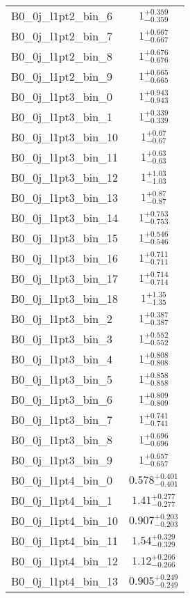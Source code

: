\begin{tabular}{|l|c|}
B0\_0j\_l1pt2\_bin\_6 & $1^{+0.359}_{-0.359}$ \\
B0\_0j\_l1pt2\_bin\_7 & $1^{+0.667}_{-0.667}$ \\
B0\_0j\_l1pt2\_bin\_8 & $1^{+0.676}_{-0.676}$ \\
B0\_0j\_l1pt2\_bin\_9 & $1^{+0.665}_{-0.665}$ \\
B0\_0j\_l1pt3\_bin\_0 & $1^{+0.943}_{-0.943}$ \\
B0\_0j\_l1pt3\_bin\_1 & $1^{+0.339}_{-0.339}$ \\
B0\_0j\_l1pt3\_bin\_10 & $1^{+0.67}_{-0.67}$ \\
B0\_0j\_l1pt3\_bin\_11 & $1^{+0.63}_{-0.63}$ \\
B0\_0j\_l1pt3\_bin\_12 & $1^{+1.03}_{-1.03}$ \\
B0\_0j\_l1pt3\_bin\_13 & $1^{+0.87}_{-0.87}$ \\
B0\_0j\_l1pt3\_bin\_14 & $1^{+0.753}_{-0.753}$ \\
B0\_0j\_l1pt3\_bin\_15 & $1^{+0.546}_{-0.546}$ \\
B0\_0j\_l1pt3\_bin\_16 & $1^{+0.711}_{-0.711}$ \\
B0\_0j\_l1pt3\_bin\_17 & $1^{+0.714}_{-0.714}$ \\
B0\_0j\_l1pt3\_bin\_18 & $1^{+1.35}_{-1.35}$ \\
B0\_0j\_l1pt3\_bin\_2 & $1^{+0.387}_{-0.387}$ \\
B0\_0j\_l1pt3\_bin\_3 & $1^{+0.552}_{-0.552}$ \\
B0\_0j\_l1pt3\_bin\_4 & $1^{+0.808}_{-0.808}$ \\
B0\_0j\_l1pt3\_bin\_5 & $1^{+0.858}_{-0.858}$ \\
B0\_0j\_l1pt3\_bin\_6 & $1^{+0.809}_{-0.809}$ \\
B0\_0j\_l1pt3\_bin\_7 & $1^{+0.741}_{-0.741}$ \\
B0\_0j\_l1pt3\_bin\_8 & $1^{+0.696}_{-0.696}$ \\
B0\_0j\_l1pt3\_bin\_9 & $1^{+0.657}_{-0.657}$ \\
B0\_0j\_l1pt4\_bin\_0 & $0.578^{+0.401}_{-0.401}$ \\
B0\_0j\_l1pt4\_bin\_1 & $1.41^{+0.277}_{-0.277}$ \\
B0\_0j\_l1pt4\_bin\_10 & $0.907^{+0.203}_{-0.203}$ \\
B0\_0j\_l1pt4\_bin\_11 & $1.54^{+0.329}_{-0.329}$ \\
B0\_0j\_l1pt4\_bin\_12 & $1.12^{+0.266}_{-0.266}$ \\
B0\_0j\_l1pt4\_bin\_13 & $0.905^{+0.249}_{-0.249}$ \\

\end{tabular}
